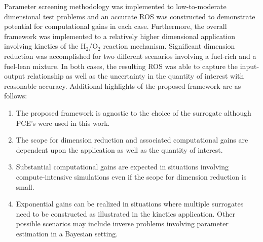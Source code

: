 Parameter screening methodology was implemented to low-to-moderate dimensional test problems
and an accurate ROS was constructed to demonstrate potential for computational gains in
each case. Furthermore, the overall framework was implemented  to a relatively higher 
dimensional application involving kinetics of the H$_2$/O$_2$ reaction mechanism. 
Significant dimension reduction was accomplished for two different scenarios involving
a fuel-rich and a fuel-lean mixture. In both cases, the resulting ROS was able to capture
the input-output relationship as well as the uncertainty in the quantity of interest with 
reasonable accuracy. Additional highlights of the proposed framework are as follows:
\begin{enumerate}
\item The proposed framework is agnostic to the choice of the surrogate although PCE's were used
in this work. 
\item The scope for dimension reduction and associated computational gains are
dependent upon the application as well as the quantity of interest. 
\item Substantial computational gains are expected in situations involving compute-intensive
simulations even if the scope for dimension reduction is small. 
\item Exponential gains can be realized in situations where multiple surrogates need to be
constructed as illustrated in the kinetics application. Other possible scenarios may
include inverse problems involving parameter estimation in a Bayesian setting. 
\end{enumerate}

